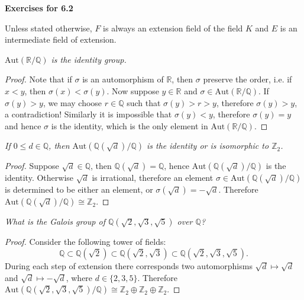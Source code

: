 \begin{center}
\begin{large}
    \textbf{Exercises for 6.2}
\end{large}
\end{center}
Unless stated otherwise, $F$ is always an extension field of the field $K$ and $E$ is an intermediate field of extension.
\begin{problem}\em
$\mathrm{Aut}(\mathbb{R}/\mathbb{Q})$ is the identity group.
\end{problem}
\begin{proof}
Note that if $\sigma$ is an automorphism of $\mathbb{R}$, then $\sigma$ preserve the order, i.e. if $x<y$, then $\sigma(x)<\sigma(y)$. Now suppose $y\in\mathbb{R}$ and $\sigma\in\mathrm{Aut}(\mathbb{R}/\mathbb{Q})$. If $\sigma(y)>y$, we may choose $r\in\mathbb{Q}$ such that $\sigma(y)>r>y$, therefore $\sigma(y)>y$, a contradiction! Similarly it is impossible that $\sigma(y)<y$, therefore $\sigma(y)=y$ and hence $\sigma$ is the identity, which is the only element in $\mathrm{Aut}(\mathbb{R}/\mathbb{Q})$.
\end{proof}
\begin{problem}\em
If $0\leq d\in \mathbb{Q}$, then $\mathrm{Aut}(\mathbb{Q}(\sqrt{d})/\mathbb{Q})$ is the identity or is isomorphic to $\mathbb{Z}_2$.
\end{problem}
\begin{proof}
Suppose $\sqrt{d}\in\mathbb{Q}$, then $\mathbb{Q}(\sqrt{d})=\mathbb{Q}$, hence $\mathrm{Aut}(\mathbb{Q}(\sqrt{d})/\mathbb{Q})$ is the identity. Otherwise $\sqrt{d}$ is irrational, therefore an element $\sigma\in\mathrm{Aut}(\mathbb{Q}(\sqrt{d})/\mathbb{Q})$ is determined to be either an element, or $\sigma(\sqrt{d})=-\sqrt{d}$. Therefore $\mathrm{Aut}(\mathbb{Q}(\sqrt{d})/\mathbb{Q})\cong\mathbb{Z}_2$.
\end{proof}
\begin{problem}\em
What is the Galois group of $\mathbb{Q}(\sqrt{2}, \sqrt{3}, \sqrt{5})$ over $\mathbb{Q}$?
\end{problem}
\begin{proof}
Consider the following tower of fields: 
$$
\mathbb{Q} \subset \mathbb{Q} \left( \sqrt{2} \right) \subset \mathbb{Q} \left( \sqrt{2},\sqrt{3} \right) \subset \mathbb{Q} \left( \sqrt{2},\sqrt{3},\sqrt{5} \right) .
$$
During each step of extension there corresponds two automorphisms $\sqrt{d}\mapsto\sqrt{d}$ and $\sqrt{d}\mapsto-\sqrt{d}$, where $d\in\{2,3,5\}$. Therefore $\mathrm{Aut}(\mathbb{Q}(\sqrt{2},\sqrt{3},\sqrt{5})/\mathbb{Q})\cong\mathbb{Z}_2\oplus\mathbb{Z}_2\oplus\mathbb{Z}_2$.
\end{proof}
